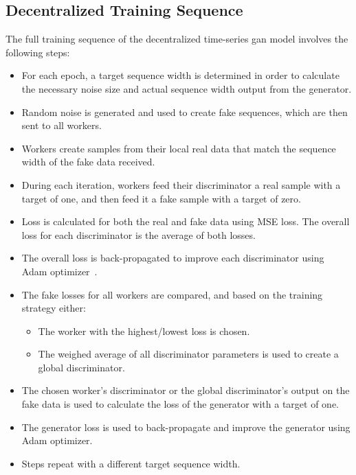 \subsection{Decentralized Training Sequence}
%
The full training sequence of the decentralized time-series \gls*{gan} model involves the following steps:
%
\begin{itemize}
\item For each epoch, a target sequence width is determined in order to calculate the necessary noise size and actual sequence width output from the generator.
\item Random noise is generated and used to create fake sequences, which are then sent to all workers.
\item Workers create samples from their local real data that match the sequence width of the fake data received.
\item During each iteration, workers feed their discriminator a real sample with a target of one, and then feed it a fake sample with a target of zero.
\item Loss is calculated for both the real and fake data using MSE loss. The overall loss for each discriminator is the average of both losses.
\item The overall loss is back-propagated to improve each discriminator using Adam optimizer~\cite{adam_optimizer}.
\item The fake losses for all workers are compared, and based on the training strategy either:
\begin{itemize}
\item The worker with the highest/lowest loss is chosen.
\item The weighed average of all discriminator parameters is used to create a global discriminator. %
\end{itemize}
\item The chosen worker's discriminator or the global discriminator's output on the fake data is used to calculate the loss of the generator with a target of one.
\item The generator loss is used to back-propagate and improve the generator using Adam optimizer.
\item Steps repeat with a different target sequence width.
\end{itemize}


